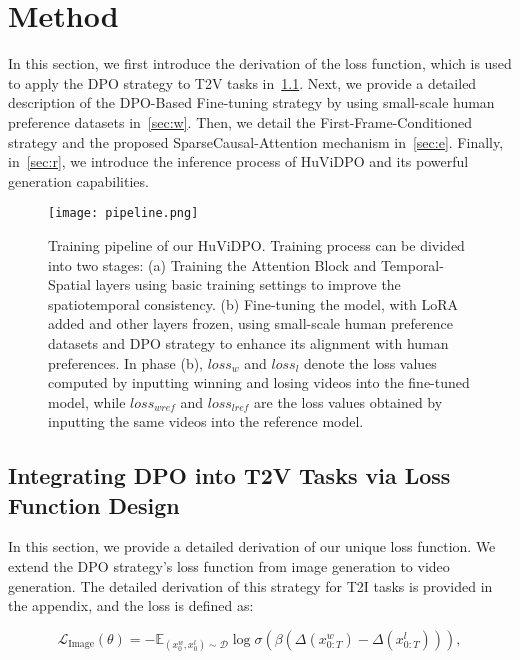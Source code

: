 \section{Method}
\label{sec:2}

In this section, we first introduce the derivation of the loss function, which is used to apply the DPO strategy to T2V tasks in~\cref{sec:q}. Next, we provide a detailed description of the DPO-Based Fine-tuning strategy by using small-scale human preference datasets in~\cref{sec:w}. Then, we detail the First-Frame-Conditioned strategy and the proposed SparseCausal-Attention mechanism in~\cref{sec:e}. Finally, in~\cref{sec:r}, we introduce the inference process of HuViDPO and its powerful generation capabilities.

\begin{figure*}[t]
  \centering
    \texttt{[image: pipeline.png]}

   \caption{Training pipeline of our HuViDPO. Training process can be divided into two stages: (a) Training the Attention Block and Temporal-Spatial layers using basic training settings to improve the spatiotemporal consistency. (b) Fine-tuning the model, with LoRA added and other layers frozen, using small-scale human preference datasets and DPO strategy to enhance its alignment with human preferences. In phase (b), $loss_w$ and $loss_l$ denote the loss values computed by inputting winning and losing videos into the fine-tuned model, while $loss_{wref}$ and $loss_{lref}$ are the loss values obtained by inputting the same videos into the reference model.}
   \label{fig:2}
\end{figure*}

\subsection{Integrating DPO into T2V Tasks via Loss Function Design}
\label{sec:q}

In this section, we provide a detailed derivation of our unique loss function. We extend the DPO strategy's loss function from image generation to video generation. The detailed derivation of this strategy for T2I tasks is provided in the appendix, and the loss is defined as:

\begin{equation}
\label{eq:1}
\mathcal{L}_{\text{Image}}(\theta) = -\mathbb{E}_{(x_{0}^w, x_{0}^l) \sim \mathcal{D}} \log \sigma \left( \beta \left( \Delta(x_{0:T}^w) - \Delta(x_{0:T}^l) \right) \right),
\end{equation}

